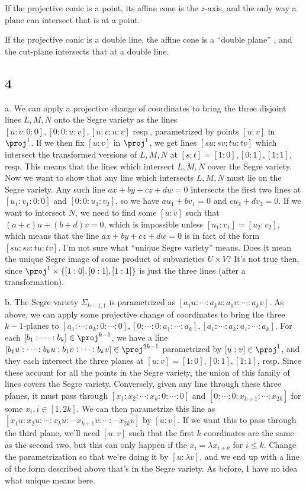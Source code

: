 \documentclass{article}
\begin{document}
If the projective conic is a point, its affine cone is the $z$-axis, and the only way a plane can intersect that is at a point.

If the projective conic is a double line, the affine cone is a ``double plane'' , and the cut-plane intersects that at a double line.
\subsection*{4}
a. We can apply a projective change of coordinates to bring the three disjoint lines $L,M,N$ onto the Segre variety as the lines $[u:v:0:0],[0:0:u:v],[u:v:u:v]$ resp., parametrized by points $[u:v]$ in $\proj^1$. If we then fix $[u:v]$ in $\proj^1$, we get lines $[su:sv:tu:tv]$ which intersect the transformed versions of $L,M,N$ at $[s:t]=[1:0],[0:1],[1:1]$, resp. This means that the lines which intersect $L,M,N$ cover the Segre variety. Now we want to show that any line which intersects $L,M,N$ must lie on the Segre variety. Any such line $ax+by+cz+dw=0$ intersects the first two lines at $[u_1:v_1:0:0]$ and $[0:0:u_2:v_2]$, so we have $au_1+bv_1=0$ and $cu_2+dv_2=0$. If we want to intersect $N$, we need to find some $[u:v]$ such that $(a+c)u+(b+d)v=0$, which is impossible unless $[u_1:v_1]=[u_2:v_2]$, which means that the line $ax+by+cz+dw=0$ is in fact of the form $[su:sv:tu:tv]$. I'm not sure what ``unique Segre variety'' means. Does it mean the unique Segre image of some product of subvarieties $U\times V$? It's not true then, since $\proj^1\times\{[1:0],[0:1],[1:1]\}$ is just the three lines (after a transformation).

b. The Segre variety $\Sigma_{k-1,1}$ is parametrized as $[a_1u:\cdots:a_{k}u:a_1v:\cdots:a_kv]$. As above, we can apply some projective change of coordinates to bring the three $k-1$-planes to $[a_1:\cdots:a_k:0:\cdots:0], [0:\cdots:0:a_1:\cdots:a_k],[a_1:\cdots:a_k:a_1:\cdots:a_k]$. For each $[b_1:\cdots:b_k]\in\proj^{k-1}$, we have a line $[b_1u:\cdots:b_{k}u:b_1v:\cdots:b_kv]\in\proj^{2k-1}$ parametrized by $[u:v]\in\proj^1$, and they each intersect the three planes at $[u:v]=[1:0],[0:1],[1:1]$, resp. Since these account for all the points in the Segre variety, the union of this family of lines covers the Segre variety. Conversely, given any line through these three planes, it must pass through $[x_1:x_2:\cdots:x_k:0:\cdots:0]$ and $[0:\cdots:0:x_{k+1}:\cdots:x_{2k}]$ for some $x_i,i\in[1,2k]$. We can then parametrize this line as $[x_1u:x_2u:\cdots:x_ku:-x_{k+1}v:\cdots:-x_{2k}v]$ by $[u:v]$. If we want this to pass through the third plane, we'll need $[u:v]$ such that the first $k$ coordinates are the same as the second two, but this can only happen if the $x_i=\lambda x_{i+k}$ for $i\leq k$. Change the parametrization so that we're doing it by $[u:\lambda v]$, and we end up with a line of the form described above that's in the Segre variety. As before, I have no idea what unique means here.
\end{document}
